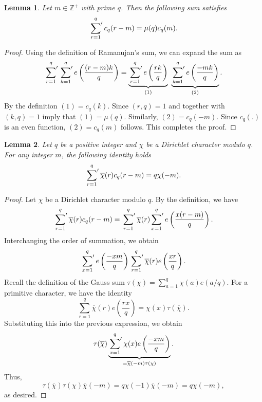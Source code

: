 \documentclass[oneside,reqno,10pt]{amsart}
\numberwithin{equation}{section}
\theoremstyle{plain}
\newtheorem{lemma}{Lemma}
\theoremstyle{definition}
\numberwithin{equation}{section}
\begin{document}
\begin{lemma}\label{mu q c_q}
    Let $m \in \mathbb{Z}^+$ with prime $q$. Then the following sum satisfies
    \begin{equation*}
        \sideset{}{'}\sum_{r=1}^{q}  c_q(r-m) = \mu(q)c_q(m).
    \end{equation*}
\end{lemma}
\begin{proof}
    Using the definition of Ramanujan's sum, we can expand the sum as
    \begin{equation*}
        \sideset{}{'}\sum_{r=1}^q \sideset{}{'}\sum_{k=1}^q e\left(\frac{(r-m)k}{q}\right)= \underbrace{\sideset{}{'}\sum_{r=1}^q e\left(\frac{rk}{q}\right)}_{(1)}\  \underbrace{\sideset{}{'}\sum_{k=1}^q e\left(\frac{-mk}{q} \right)}_{(2)}.
    \end{equation*}
    By the definition $(1)=c_q(k)$. Since $(r,q)=1$ and together with $(k,q)=1$ imply that $(1)=\mu(q)$. Similarly, $(2)=c_q(-m)$. Since $c_q(.)$ is an even function, $(2)=c_q(m)$ follows. This completes the proof.    
\end{proof}
\begin{lemma}\label{gauss sum part}
    Let $q$ be a positive integer and $\chi$ be a Dirichlet character modulo $q$. For any integer $m$, the following identity holds
    \begin{equation*}
        \sideset{}{'}\sum_{r=1}^q \overline{\chi}(r)c_q(r-m) = q \chi(-m).
    \end{equation*}
\end{lemma}
\begin{proof}
    Let $\chi$ be a Dirichlet character modulo $q$. By the definition, we have
    \begin{equation*}
        \sideset{}{'}\sum_{r=1}^q \overline{\chi}(r)c_q(r-m) = \sideset{}{'}\sum_{r=1}^q \overline{\chi}(r) \sideset{}{'}\sum_{x=1}^q e\left(\frac{x(r-m)}{q} \right).
    \end{equation*}
    Interchanging the order of summation, we obtain
    \begin{equation*}
        \sideset{}{'}\sum_{x=1}^q e\left(\frac{-xm}{q} \right) \sideset{}{'}\sum_{r=1}^q \overline{\chi}(r) e\left(\frac{xr}{q} \right).
    \end{equation*}
    Recall the definition of the Gauss sum $\tau(\chi)=\sum_{a=1}^q \chi(a)e(a/q)$. For a primitive character, we have the identity
    \begin{equation*}
        \sum_{r=1}^q \overline{\chi}(r) e\left(\frac{rx}{q}\right) = \chi(x)\tau(\overline{\chi}).
    \end{equation*}
    Substituting this into the previous expression, we obtain
    \begin{equation*}
         \tau(\overline{\chi})\underbrace{\sideset{}{'}\sum_{x=1}^q \chi(x)e\left(\frac{-xm}{q} \right)}_{=\overline{\chi}(-m)\tau(\chi)}. 
    \end{equation*}
    Thus,
    \begin{equation*}
        \tau(\overline{\chi})\tau(\chi)\overline{\chi}(-m)=q\chi(-1)\overline{\chi}(-m)=q\chi(-m),
    \end{equation*}
    as desired.
\end{proof}
\end{document}
